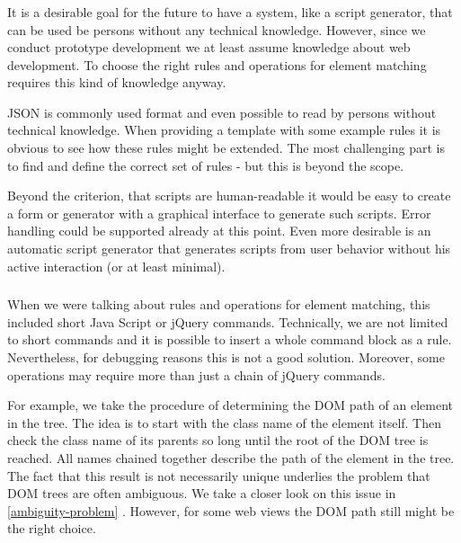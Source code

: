 \subsubsection[Syntax]{\reqSiii}

It is a desirable goal for the future to have a system, like a script generator, that can be used be persons without any technical knowledge. However, since we conduct prototype development we at least assume knowledge about web development. To choose the right rules and operations for element matching requires this kind of knowledge anyway. 

JSON is commonly used format and even possible to read by persons without technical knowledge. When providing a template with some example rules it is obvious to see how these rules might be extended. 
The most challenging part is to find and define the correct set of rules - but this is beyond the scope. 

Beyond the criterion, that scripts are human-readable it would be easy to create a form or generator with a graphical interface to generate such scripts. Error handling could be supported already at this point. Even more desirable is an automatic script generator that generates scripts from user behavior without his active interaction (or at least minimal). 

\subsubsection[Plugin Extension]{\reqSiv}

When we were talking about rules and operations for element matching, this included short Java Script or jQuery commands. Technically, we are not limited to short commands and it is possible to insert a whole command block as a rule. Nevertheless, for debugging reasons this is not a good solution. Moreover, some operations may require more than just a chain of jQuery commands. 

For example, we take the procedure of determining the DOM path of an element in the tree. The idea is to start with the class name of the element itself. Then check the class name of its parents so long until the root of the DOM tree is reached. All names chained together describe the path of the element in the tree. The fact that this result is not necessarily unique underlies the problem that DOM trees are often ambiguous. We take a closer look on this issue in \ref{ambiguity-problem} . However, for some web views the DOM path still might be the right choice. 

